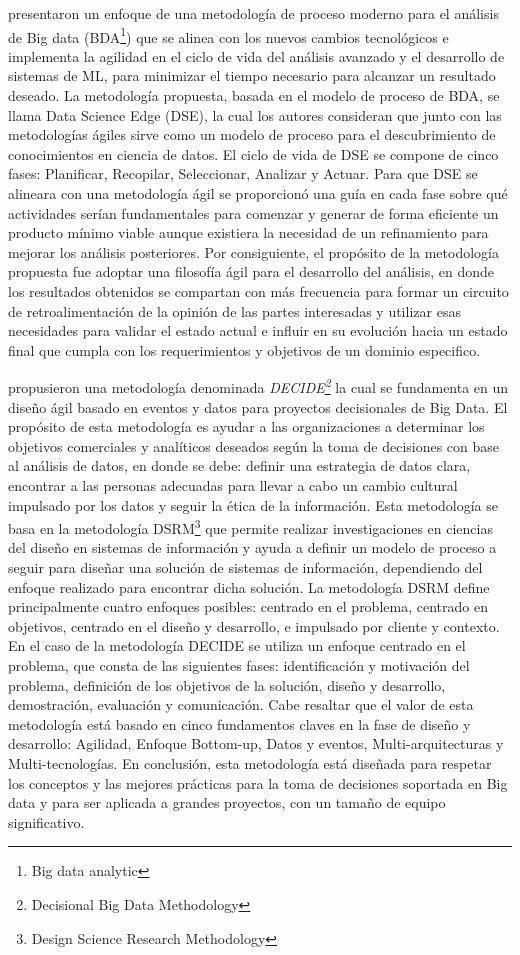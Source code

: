\cite{Grady2017} presentaron un enfoque de una metodología de proceso moderno para el análisis de Big data (BDA\footnote{Big data analytic}) que se alinea con los nuevos cambios tecnológicos e implementa la agilidad en el ciclo de vida del análisis avanzado y el desarrollo de sistemas de ML, para minimizar el tiempo necesario para alcanzar un resultado deseado. La metodología propuesta, basada en el modelo de proceso de BDA, se llama Data Science Edge (DSE), la cual los autores consideran que junto con las metodologías ágiles sirve como un modelo de proceso para el descubrimiento de conocimientos en ciencia de datos. El ciclo de vida de DSE se compone de cinco fases: Planificar, Recopilar, Seleccionar, Analizar y Actuar. Para que DSE se alineara con una metodología ágil se proporcionó una guía en cada fase sobre qué actividades serían fundamentales para comenzar y generar de forma eficiente un producto mínimo viable aunque existiera la necesidad de un refinamiento para mejorar los análisis posteriores. Por consiguiente, el propósito de la metodología propuesta fue adoptar una filosofía ágil para el desarrollo del análisis, en donde los resultados obtenidos se compartan con más frecuencia para formar un circuito de retroalimentación de la opinión de las partes interesadas y utilizar esas necesidades para validar el estado actual e influir en su evolución hacia un estado final que cumpla con los requerimientos y objetivos de un dominio especifico.

\cite{Sfaxi2020} propusieron una metodología denominada \textit{DECIDE\footnote{Decisional Big Data Methodology}} la cual se fundamenta en un diseño ágil basado en eventos y datos para proyectos decisionales de Big Data. El propósito de esta metodología es ayudar a las organizaciones a determinar los objetivos comerciales y analíticos deseados según la toma de decisiones con base al análisis de datos, en donde se debe: definir una estrategia de datos clara, encontrar a las personas adecuadas para llevar a cabo un cambio cultural impulsado por los datos y seguir la ética de la información. Esta metodología se basa en la metodología DSRM\footnote{Design Science Research Methodology} que permite realizar investigaciones en ciencias del diseño en sistemas de información y ayuda a definir un modelo de proceso a seguir para diseñar una solución de sistemas de información, dependiendo del enfoque realizado para encontrar dicha solución. La metodología DSRM define principalmente cuatro enfoques posibles: centrado en el problema, centrado en objetivos, centrado en el diseño y desarrollo, e impulsado por cliente y contexto. En el caso de la metodología DECIDE se utiliza un enfoque centrado en el problema, que consta de las siguientes fases: identificación y motivación del problema, definición de los objetivos de la solución, diseño y desarrollo, demostración, evaluación y comunicación. Cabe resaltar que el valor de esta metodología está basado en cinco fundamentos claves en la fase de diseño y desarrollo: Agilidad, Enfoque Bottom-up, Datos y eventos, Multi-arquitecturas y Multi-tecnologías. En conclusión, esta metodología está diseñada para respetar los conceptos y las mejores prácticas para la toma de decisiones soportada en Big data y para ser aplicada a grandes proyectos, con un tamaño de equipo significativo. 

